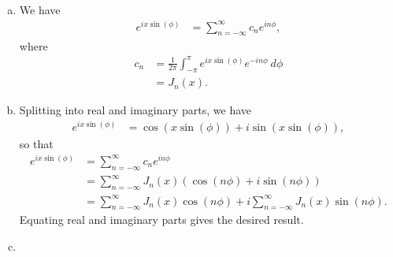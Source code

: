 \documentclass[10pt]{mypackage}
\begin{document}
\begin{solution}[35.8]\hfill
  \begin{enumerate}[(a)]
    \item We have
      \begin{align*}
        e^{ix\sin\left( \phi \right)} &= \sum_{n=-\infty}^{\infty}c_ne^{in\phi},
      \end{align*}
      where
      \begin{align*}
        c_n &= \frac{1}{2\pi}\int_{-\pi}^{\pi} e^{ix\sin\left( \phi \right)}e^{-in\phi}\:d\phi\\
            &= J_n\left( x \right).
      \end{align*}
    \item Splitting into real and imaginary parts, we have
      \begin{align*}
        e^{ix\sin\left( \phi \right)} &= \cos\left( x\sin\left( \phi \right) \right) + i\sin\left( x\sin\left( \phi \right) \right),
      \end{align*}
      so that
      \begin{align*}
        e^{ix\sin\left( \phi \right)} &= \sum_{n=-\infty}^{\infty}c_ne^{in\phi}\\
                                      &= \sum_{n=-\infty}^{\infty} J_n\left( x \right)\left( \cos\left( n\phi \right) + i\sin\left( n\phi \right) \right)\\
                                      &= \sum_{n=-\infty}^{\infty}J_n\left( x \right)\cos\left( n\phi \right) + i\sum_{n=-\infty}^{\infty}J_n\left( x \right)\sin\left( n\phi \right).
      \end{align*}
      Equating real and imaginary parts gives the desired result.
    \item 
  \end{enumerate}
\end{solution}
\begin{solution}[35.10]

\end{solution}
\begin{solution}[35.11]

\end{solution}
\begin{solution}[35.12]

\end{solution}
\begin{solution}[35.16]

\end{solution}
\begin{solution}[35.17 (c)]

\end{solution}
\begin{solution}[35.21]

\end{solution}
\begin{solution}[35.25]

\end{solution}
\end{document}
